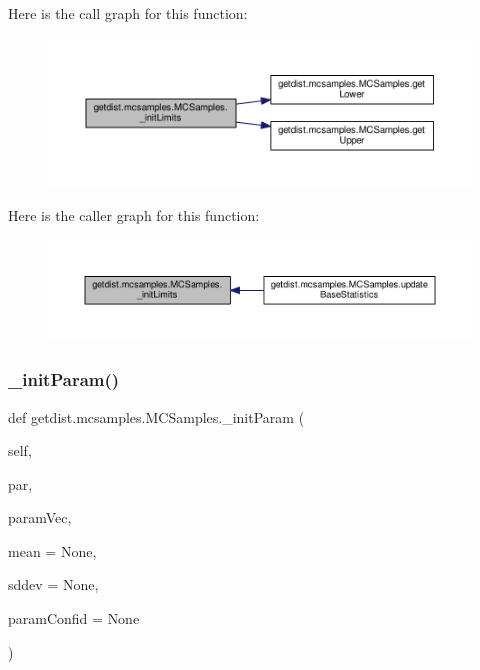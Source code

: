 Here is the call graph for this function\+:
\nopagebreak
\begin{figure}[H]
\begin{center}
\leavevmode
\includegraphics[width=350pt]{classgetdist_1_1mcsamples_1_1MCSamples_a33b6439bd4c616568c29c628ed3e75f1_cgraph}
\end{center}
\end{figure}
Here is the caller graph for this function\+:
\nopagebreak
\begin{figure}[H]
\begin{center}
\leavevmode
\includegraphics[width=350pt]{classgetdist_1_1mcsamples_1_1MCSamples_a33b6439bd4c616568c29c628ed3e75f1_icgraph}
\end{center}
\end{figure}
\mbox{\label{classgetdist_1_1mcsamples_1_1MCSamples_ab6b6a1e603f89d1266dd7d2f5e6ae51c}} 
\subsubsection{\texorpdfstring{\+\_\+init\+Param()}{\_initParam()}}
{\footnotesize\ttfamily def getdist.\+mcsamples.\+M\+C\+Samples.\+\_\+init\+Param (\begin{DoxyParamCaption}\item[{}]{self,  }\item[{}]{par,  }\item[{}]{param\+Vec,  }\item[{}]{mean = {\ttfamily None},  }\item[{}]{sddev = {\ttfamily None},  }\item[{}]{param\+Confid = {\ttfamily None} }\end{DoxyParamCaption})\hspace{0.3cm}{\ttfamily [private]}}



